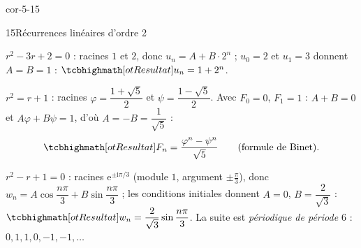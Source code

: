 \begin{blocLivre}{cor-5-15}
\begin{corrige}{15}{Récurrences linéaires d'ordre 2}
\begin{questions}
  \item $r^{2}-3r+2=0$ : racines $1$ et $2$, donc $u_n=A+B\cdot2^{n}$ ;
    $u_0=2$ et $u_1=3$ donnent $A=B=1$ :
    $\res{u_n=1+2^{n}}$.
  \item $r^{2}=r+1$ : racines $\varphi=\dfrac{1+\sqrt5}{2}$ et
    $\psi=\dfrac{1-\sqrt5}{2}$. Avec $F_0=0$, $F_1=1$ :
    $A+B=0$ et $A\varphi+B\psi=1$, d'où $A=-B=\dfrac{1}{\sqrt5}$ :
    \[
      \res{F_n=\frac{\varphi^{n}-\psi^{n}}{\sqrt5}}
      \qquad\text{(formule de Binet).}
    \]
  \item $r^{2}-r+1=0$ : racines $\mathrm{e}^{\pm\mathrm{i}\pi/3}$ (module $1$,
    argument $\pm\frac{\pi}{3}$), donc
    $w_n=A\cos\dfrac{n\pi}{3}+B\sin\dfrac{n\pi}{3}$ ; les conditions
    initiales donnent $A=0$, $B=\dfrac{2}{\sqrt3}$ :
    $\res{w_n=\dfrac{2}{\sqrt3}\sin\dfrac{n\pi}{3}}$. La suite est
    \emph{périodique de période $6$} : $0,1,1,0,-1,-1,\dots$
\end{questions}
\end{corrige}
\end{blocLivre}

